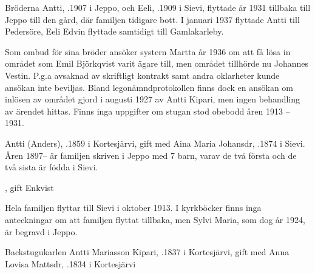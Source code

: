 

Bröderna Antti, .1907 i Jeppo, och Eeli, .1909 i Sievi, flyttade år 1931 tillbaka till Jeppo till den gård, där familjen tidigare bott. I januari 1937 flyttade Antti till Pedersöre, Eeli Edvin flyttade samtidigt till Gamlakarleby.

Som ombud för sina bröder ansöker systern Martta år 1936 om att få lösa in området som Emil Björkqvist varit ägare till, men området tillhörde nu Johannes Vestin. P.g.a avsaknad av skriftligt kontrakt samt andra oklarheter kunde ansökan inte beviljas. Bland legonämndprotokollen finns dock en ansökan om inlösen av området gjord i augusti 1927 av Antti Kipari, men ingen behandling av ärendet hittas.
Finns inga uppgifter om stugan stod obebodd åren 1913 – 1931.


Antti (Anders), .1859 i Kortesjärvi, gift med Aina Maria Johansdr, .1874 i Sievi. Åren 1897-- är familjen skriven i Jeppo med 7 barn, varav de två första och de två sista är födda i Sievi.
\begin{jhchildren}
  \item {}
  \item {}, gift Enkvist
  \item {}
  \item {}
  \item {}
  \item {}
  \item {}
\end{jhchildren}
Hela familjen flyttar till Sievi i oktober 1913. I kyrkböcker finns inga anteckningar om att familjen flyttat tillbaka, men Sylvi Maria, som dog år 1924, är begravd i Jeppo.


Backstugukarlen Antti Mariasson Kipari, .1837 i Kortesjärvi, gift med Anna Lovisa Mattsdr, .1834 i Kortesjärvi

